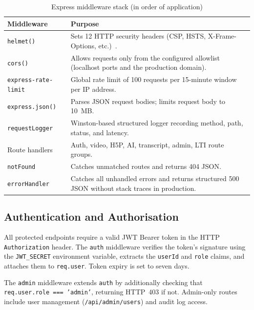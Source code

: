 \begin{table}[H]
  \centering
  \caption{Express middleware stack (in order of application)}
  \label{tab:middleware}
  \begin{tabularx}{\linewidth}{lX}
    \toprule
    \textbf{Middleware}          & \textbf{Purpose} \\
    \midrule
    \texttt{helmet()}            & Sets 12 HTTP security headers (CSP, HSTS, X-Frame-Options, etc.)~\cite{helmet2023}. \\
    \texttt{cors()}              & Allows requests only from the configured allowlist (localhost ports and the production domain). \\
    \texttt{express-rate-limit}  & Global rate limit of 100 requests per 15-minute window per IP address. \\
    \texttt{express.json()}      & Parses JSON request bodies; limits request body to 10~MB. \\
    \texttt{requestLogger}       & Winston-based structured logger recording method, path, status, and latency. \\
    Route handlers               & Auth, video, H5P, AI, transcript, admin, LTI route groups. \\
    \texttt{notFound}            & Catches unmatched routes and returns 404 JSON. \\
    \texttt{errorHandler}        & Catches all unhandled errors and returns structured 500 JSON without stack traces in production. \\
    \bottomrule
  \end{tabularx}
\end{table}

\subsection{Authentication and Authorisation}

All protected endpoints require a valid JWT Bearer token in the HTTP
\texttt{Authorization} header. The \texttt{auth} middleware verifies the
token's signature using the \texttt{JWT\_SECRET} environment variable,
extracts the \texttt{userId} and \texttt{role} claims, and attaches them
to \texttt{req.user}. Token expiry is set to seven days.

The \texttt{admin} middleware extends \texttt{auth} by additionally checking
that \texttt{req.user.role === 'admin'}, returning HTTP~403 if not. Admin-only
routes include user management (\texttt{/api/admin/users}) and audit log
access.

